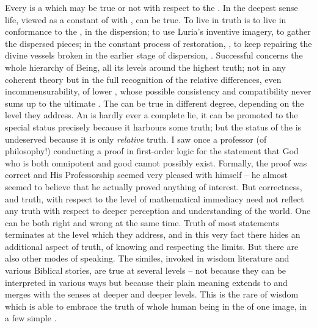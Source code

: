 \pa Every  is a  which may be true or not with respect to
the .  In the deepest sense life, viewed as a constant
 of  with , can be true.  To
live in truth is to live in conformance to the , in the  dispersion; to use Luria's inventive imagery, to gather the
dispersed pieces; in the constant process of restoration, , to
keep repairing the divine vessels broken in the earlier stage of dispersion,
.  Successful
 concerns the whole hierarchy of Being,  all its levels
around the highest truth; not in any coherent theory but in the full recognition
of the relative differences, even incommensurability, of lower
, whose possible consistency and compatibility never sums up to
the ultimate . The  can be true in different degree,
depending on the level they address. An  is hardly ever a complete lie,
it can be promoted to the special status precisely because it harbours some
truth; but the status of the  is undeserved because it is only {\em
  relative} truth. I saw once a professor (of philosophy!) conducting a proof in
first-order logic for the statement that God who is both omnipotent and good
cannot possibly exist.  Formally, the proof was correct and His Professorship
seemed very pleased with himself -- he almost seemed to believe that he actually
proved anything of interest. But correctness, and truth, with respect to the
level of mathematical immediacy need not reflect any truth with respect to
deeper perception and understanding of the world. One can be both right and
wrong at the same time.  Truth of most statements terminates at
the level which they address, and in this very fact there hides an additional
aspect of truth, of knowing and respecting the limits. But there are also other
modes of speaking. The similes, invoked in wisdom literature and various
Biblical stories, are true at several levels -- not because they can be
interpreted in various ways but because their plain meaning extends to and
merges with the senses at deeper and deeper levels. This is the rare 
of wisdom which is able to embrace the truth of whole human being in the
 of one image, in a few simple .


